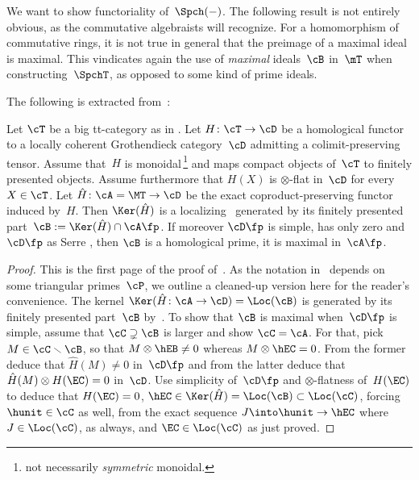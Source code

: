 \begin{Rem}
We want to show functoriality of~$\Spch(-)$. The following result is not entirely obvious, as the commutative algebraists will recognize. For a homomorphism of commutative rings, it is not true in general that the preimage of a maximal ideal is maximal. This vindicates again the use of \emph{maximal} ideals~$\cB$ in~$\mT$ when constructing~$\SpchT$, as opposed to some kind of prime ideals.
\end{Rem}

The following is extracted from~\cite{Balmer20a}:
\begin{Prop}
\label{Prop:Finv}
Let $\cT$ be a big tt-category as in . Let $H\colon \cT\to \cD$ be a homological functor to a locally coherent Grothendieck category~$\cD$ admitting a colimit-preserving tensor. Assume that~$H$ is monoidal\,\footnote{not necessarily \emph{symmetric} monoidal.} and maps compact objects of~$\cT$ to finitely presented objects. Assume furthermore that $H(X)$ is $\otimes$-flat in~$\cD$ for every~$X\in\cT$. Let $\hat H\colon \cA=\MT\to \cD$ be the exact coproduct-preserving functor induced by~$H$. Then $\Ker(\hat H)$ is a localizing \tensid\ generated by its finitely presented part~$\cB:=\Ker(\hat H)\cap \cA\fp$. If moreover $\cD\fp$ is simple, \ie has only zero and~$\cD\fp$ as Serre \tensids, then $\cB$ is a homological prime, \ie it is maximal in~$\cA\fp$.
\end{Prop}

\begin{proof}
This is the first page of the proof of~\cite[Th.\,5.6]{Balmer20a}. As the notation in \loccit\ depends on some triangular primes~$\cP$, we outline a cleaned-up version here for the reader's convenience. The kernel $\Ker(\hat H\colon \cA\to \cD)=\Loc(\cB)$ is generated by its finitely presented part~$\cB$ by~\cite[Prop.\,A.6]{BalmerKrauseStevenson19}. To show that $\cB$ is maximal when~$\cD\fp$ is simple, assume that $\cC\supsetneq\cB$ is larger and show $\cC=\cA$. For that, pick $M\in\cC\smallsetminus\cB$, so that $M\otimes\hEB\neq 0$ whereas $M\otimes\hEC=0$. From the former deduce that $\hat H(M)\neq 0$ in~$\cD\fp$ and from the latter deduce that $\hat H(M)\otimes H(\EC)=0$ in~$\cD$. Use simplicity of~$\cD\fp$ and $\otimes$\nobreakdash-flatness of~$H(\EC)$ to deduce that $H(\EC)=0$, \ie $\hEC\in\Ker(\hat H)=\Loc(\cB)\subset\Loc(\cC)$, forcing $\hunit\in\cC$ as well, from the exact sequence $J\into \hunit\to \hEC$ where $J\in\Loc(\cC)$, as always, and $\EC\in\Loc(\cC)$ as just proved.
\end{proof}

